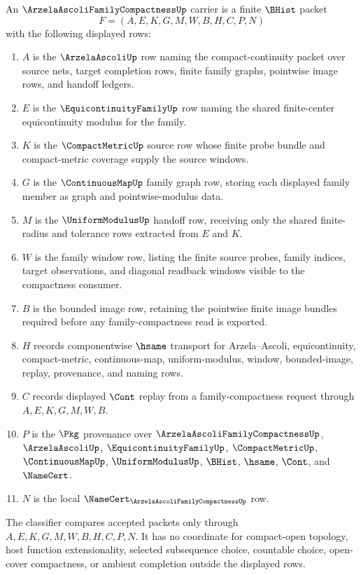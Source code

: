 \begin{definition}
\label{def:arzela-ascoli-family-compactness-carrier}
An $\ArzelaAscoliFamilyCompactnessUp$ carrier is a finite $\BHist$ packet
$$
F=(A,E,K,G,M,W,B,H,C,P,N)
$$
with the following displayed rows:
\begin{enumerate}
\item $A$ is the $\ArzelaAscoliUp$ row naming the compact-continuity packet over source nets, target completion rows, finite family graphs, pointwise image rows, and handoff ledgers.
\item $E$ is the $\EquicontinuityFamilyUp$ row naming the shared finite-center equicontinuity modulus for the family.
\item $K$ is the $\CompactMetricUp$ source row whose finite probe bundle and compact-metric coverage supply the source windows.
\item $G$ is the $\ContinuousMapUp$ family graph row, storing each displayed family member as graph and pointwise-modulus data.
\item $M$ is the $\UniformModulusUp$ handoff row, receiving only the shared finite-radius and tolerance rows extracted from $E$ and $K$.
\item $W$ is the family window row, listing the finite source probes, family indices, target observations, and diagonal readback windows visible to the compactness consumer.
\item $B$ is the bounded image row, retaining the pointwise finite image bundles required before any family-compactness read is exported.
\item $H$ records componentwise $\hsame$ transport for Arzela--Ascoli, equicontinuity, compact-metric, continuous-map, uniform-modulus, window, bounded-image, replay, provenance, and naming rows.
\item $C$ records displayed $\Cont$ replay from a family-compactness request through $A,E,K,G,M,W,B$.
\item $P$ is the $\Pkg$ provenance over $\ArzelaAscoliFamilyCompactnessUp$, $\ArzelaAscoliUp$, $\EquicontinuityFamilyUp$, $\CompactMetricUp$, $\ContinuousMapUp$, $\UniformModulusUp$, $\BHist$, $\hsame$, $\Cont$, and $\NameCert$.
\item $N$ is the local $\NameCert_{\ArzelaAscoliFamilyCompactnessUp}$ row.
\end{enumerate}
The classifier compares accepted packets only through $A,E,K,G,M,W,B,H,C,P,N$. It has no coordinate for compact-open topology, host function extensionality, selected subsequence choice, countable choice, open-cover compactness, or ambient completion outside the displayed rows.
\end{definition}

